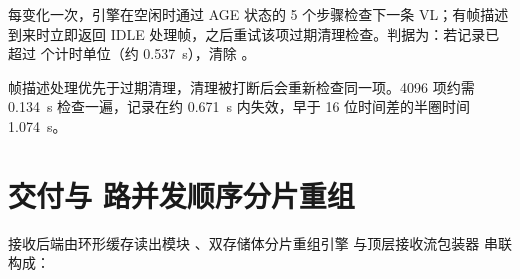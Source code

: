  每变化一次，引擎在空闲时通过 AGE 状态的 5 个步骤检查下一条 VL；有帧描述到来时立即返回 IDLE 处理帧，之后重试该项过期清理检查。判据为：若记录已超过  个计时单位（约 0.537~s），清除 。

帧描述处理优先于过期清理，清理被打断后会重新检查同一项。4096 项约需 0.134~s 检查一遍，记录在约 0.671~s 内失效，早于 16 位时间差的半圈时间 1.074~s。

\section{交付与 \ReasmContexts{} 路并发顺序分片重组}\label{sec:rxdeliver}

接收后端由环形缓存读出模块 、双存储体分片重组引擎  与顶层接收流包装器  串联构成：
